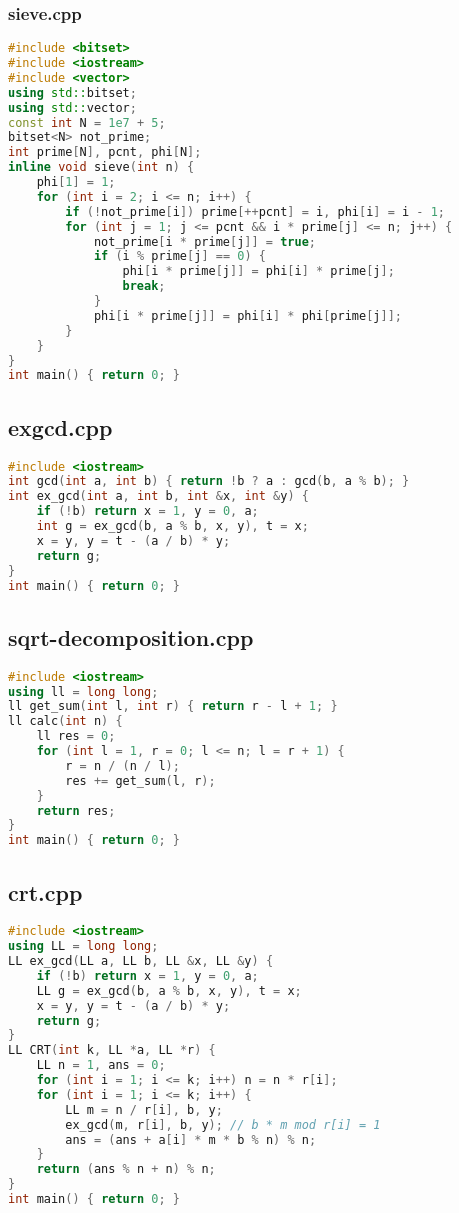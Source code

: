 \documentclass[9pt, a4paper, oneside]{book}
\begin{document}
\subsubsection{sieve.cpp}
\begin{lstlisting}[language={C++}]
#include <bitset>
#include <iostream>
#include <vector>
using std::bitset;
using std::vector;
const int N = 1e7 + 5;
bitset<N> not_prime;
int prime[N], pcnt, phi[N];
inline void sieve(int n) {
    phi[1] = 1;
    for (int i = 2; i <= n; i++) {
        if (!not_prime[i]) prime[++pcnt] = i, phi[i] = i - 1;
        for (int j = 1; j <= pcnt && i * prime[j] <= n; j++) {
            not_prime[i * prime[j]] = true;
            if (i % prime[j] == 0) {
                phi[i * prime[j]] = phi[i] * prime[j];
                break;
            }
            phi[i * prime[j]] = phi[i] * phi[prime[j]];
        }
    }
}
int main() { return 0; }\end{lstlisting}
\subsection{exgcd.cpp}
\begin{lstlisting}[language={C++}]
#include <iostream>
int gcd(int a, int b) { return !b ? a : gcd(b, a % b); }
int ex_gcd(int a, int b, int &x, int &y) {
    if (!b) return x = 1, y = 0, a;
    int g = ex_gcd(b, a % b, x, y), t = x;
    x = y, y = t - (a / b) * y;
    return g;
}
int main() { return 0; }\end{lstlisting}
\subsection{sqrt-decomposition.cpp}
\begin{lstlisting}[language={C++}]
#include <iostream>
using ll = long long;
ll get_sum(int l, int r) { return r - l + 1; }
ll calc(int n) {
    ll res = 0;
    for (int l = 1, r = 0; l <= n; l = r + 1) {
        r = n / (n / l);
        res += get_sum(l, r);
    }
    return res;
}
int main() { return 0; }\end{lstlisting}
\subsection{crt.cpp}
\begin{lstlisting}[language={C++}]
#include <iostream>
using LL = long long;
LL ex_gcd(LL a, LL b, LL &x, LL &y) {
    if (!b) return x = 1, y = 0, a;
    LL g = ex_gcd(b, a % b, x, y), t = x;
    x = y, y = t - (a / b) * y;
    return g;
}
LL CRT(int k, LL *a, LL *r) {
    LL n = 1, ans = 0;
    for (int i = 1; i <= k; i++) n = n * r[i];
    for (int i = 1; i <= k; i++) {
        LL m = n / r[i], b, y;
        ex_gcd(m, r[i], b, y); // b * m mod r[i] = 1
        ans = (ans + a[i] * m * b % n) % n;
    }
    return (ans % n + n) % n;
}
int main() { return 0; }\end{lstlisting}
\end{document}
